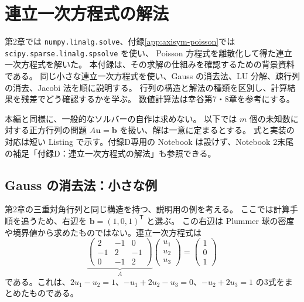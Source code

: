 \chapter{連立一次方程式の解法}
\label{app:linear-systems}

第2章では \texttt{numpy.linalg.solve}、付録\ref{app:axisym-poisson}では \texttt{scipy.sparse.linalg.spsolve} を使い、
Poisson 方程式を離散化して得た連立一次方程式を解いた。
本付録は、その求解の仕組みを確認するための背景資料である。
同じ小さな連立一次方程式を使い、Gauss の消去法、LU 分解、疎行列の消去、Jacobi 法を順に説明する。
行列の構造と解法の種類を区別し、計算結果を残差でどう確認するかを学ぶ。
数値計算法は幸谷第7・8章\cite{kouya2021}を参考にする。

本編と同様に、一般的なソルバーの自作は求めない。
以下では $m$ 個の未知数に対する正方行列の問題 $A\boldsymbol u=\boldsymbol b$ を扱い、解は一意に定まるとする。
式と実装の対応は短い Listing で示す。付録D専用の Notebook は設けず、Notebook 2末尾の補足「付録D：連立一次方程式の解法」も参照できる。

\section{Gauss の消去法：小さな例}
\label{sec:appD-elimination}

第2章の三重対角行列と同じ構造を持つ、説明用の例を考える。
ここでは計算手順を追うため、右辺を $\boldsymbol b=(1,0,1)^{\mathsf T}$ と選ぶ。
この右辺は Plummer 球の密度や境界値から求めたものではない。連立一次方程式は
\begin{equation}
 \underbrace{\begin{pmatrix}2&-1&0\\-1&2&-1\\0&-1&2\end{pmatrix}}_{A}
 \begin{pmatrix}u_1\\u_2\\u_3\end{pmatrix}
 =\begin{pmatrix}1\\0\\1\end{pmatrix}
\label{eq:appD-example}
\end{equation}
である。これは、$2u_1-u_2=1$、$-u_1+2u_2-u_3=0$、$-u_2+2u_3=1$ の3式をまとめたものである。

